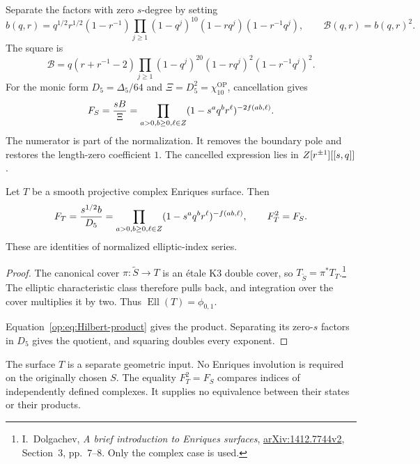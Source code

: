 Separate the factors with zero $s$-degree by setting
\begin{equation}\label{op:eq:boundary-factor}
 b(q,r)=q^{1/2}r^{1/2}(1-r^{-1})
       \prod_{j\ge1}(1-q^j)^{10}(1-rq^j)(1-r^{-1}q^j),
 \qquad \mathcal B(q,r)=b(q,r)^2.
\end{equation}
The square is
\[
 \mathcal B=q(r+r^{-1}-2)
       \prod_{j\ge1}(1-q^j)^{20}(1-rq^j)^2(1-r^{-1}q^j)^2.
\]
For the monic form $D_5=\Delta_5/64$ and
$\Xi=D_5^2=\chi_{10}^{\mathrm{OP}}$, cancellation gives
\begin{equation}\label{op:eq:K3-index}
 F_S=\frac{sB}{\Xi}
     =\prod_{a>0,b\ge0,\ell\in Z}
           (1-s^aq^br^\ell)^{-2f(ab,\ell)}.
\end{equation}
The numerator is part of the normalization.
It removes the boundary pole and restores the length-zero
coefficient $1$. The cancelled expression lies in
$Z[r^{\pm1}][[s,q]]$.

\begin{theorem}\label{op:thm:Enriques}
Let $T$ be a smooth projective complex Enriques surface.
Then
\begin{equation}\label{op:eq:Enriques-index}
 F_T=\frac{s^{1/2}b}{D_5}
     =\prod_{a>0,b\ge0,\ell\in Z}
           (1-s^aq^br^\ell)^{-f(ab,\ell)},
 \qquad F_T^2=F_S.
\end{equation}
These are identities of normalized elliptic-index series.
\end{theorem}

\begin{proof}
The canonical cover $\pi:\widetilde S\to T$ is an
\'{e}tale K3 double cover, so $T_{\widetilde S}=\pi^*T_T$.\footnote{
I.~Dolgachev, \emph{A brief introduction to Enriques surfaces},
\href{https://arxiv.org/abs/1412.7744v2}{arXiv:1412.7744v2},
Section~3, pp.~7--8. Only the complex case is used.}
The elliptic characteristic class therefore pulls back,
and integration over the cover multiplies it by two.
Thus $\operatorname{Ell}(T)=\phi_{0,1}$.

Equation~\eqref{op:eq:Hilbert-product} gives the product.
Separating its zero-$s$ factors in $D_5$ gives the quotient,
and squaring doubles every exponent.
\end{proof}

The surface $T$ is a separate geometric input.
No Enriques involution is required on the originally chosen $S$.
The equality $F_T^2=F_S$ compares indices of independently
defined complexes. It supplies no equivalence between their
states or their products.

